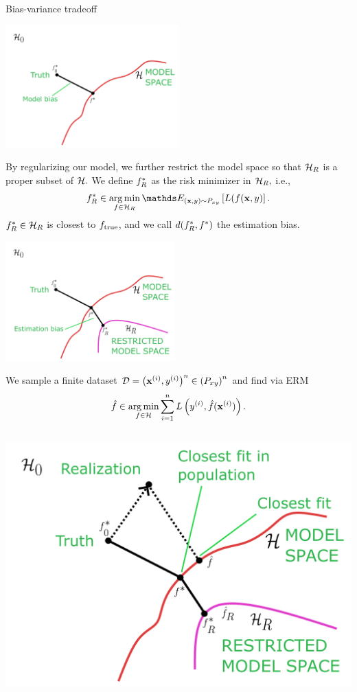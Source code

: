 \documentclass[11pt,compress,t,notes=noshow, xcolor=table]{beamer}
\begin{document}
\begin{vbframe}{Bias-variance tradeoff}
\begin{center}
\includegraphics[width=0.5\textwidth]{slides/regularization/figure_man/bv_anim_6.pdf}
\end{center}
\framebreak 
By regularizing our model, we further restrict the model space so that $\mathcal{H}_R$ is a proper subset of $\mathcal{H}.$
We define $f^{\ast}_R$ as the risk minimizer in $\mathcal{H}_R,$ i.e.,
$$\fbayes_R \in \argmin_{f \in \Hspace_R} \E_{\xy \sim \Pxy}\left[L(f(\xv, y)\right].$$
$f^{\ast}_R \in \mathcal{H}_R$ is closest to $f_{\text{true}}$, and we call $d(f^{\ast}_R, f^{\ast})$ the estimation bias.
\begin{center}
\includegraphics[width=0.49\textwidth]{slides/regularization/figure_man/bv_anim_5.pdf}
\end{center}
\framebreak

We sample a finite dataset $\mathcal{D} = \left(\mathbf{x}^{(i)}, y^{(i)}\right)^n \in \left(P_{xy}\right)^n$ and find via ERM
$$\hat{f} \in \operatorname*{arg\,min}_{f\in\mathcal{H}} \sum\limits_{i=1}^n L\left(y^{(i)}, \hat{f} (\mathbf{x}^{(i)})\right).$$

\begin{columns}[onlytextwidth,T]

  \includegraphics[width=1.0\textwidth]{slides/regularization/figure_man/bv_anim_4.pdf}


\end{columns}
\end{vbframe}
\end{document}
